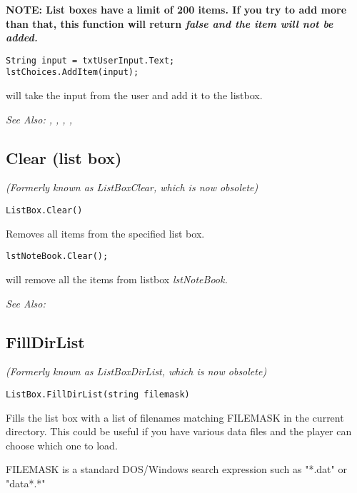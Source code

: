 \bf{NOTE:} List boxes have a limit of 200 items. If you try to add more than that,
this function will return \it{false} and the item will not be added.

\begin{verbatim}
String input = txtUserInput.Text;
lstChoices.AddItem(input);
\end{verbatim}
will take the input from the user and add it to the listbox.

\it{See Also:} ,
,
,
,


\subsection{Clear (list box)}\label{ListBox.Clear}%

\it{(Formerly known as ListBoxClear, which is now obsolete)}

\begin{verbatim}
ListBox.Clear()
\end{verbatim}
Removes all items from the specified list box.

\begin{verbatim}
lstNoteBook.Clear();
\end{verbatim}
will remove all the items from listbox \it{lstNoteBook}.

\it{See Also:} 


\subsection{FillDirList}\label{ListBox.FillDirList}%

\it{(Formerly known as ListBoxDirList, which is now obsolete)}

\begin{verbatim}
ListBox.FillDirList(string filemask)
\end{verbatim}
Fills the list box with a list of filenames matching FILEMASK in
the current directory. This could be useful if you have various
data files and the player can choose which one to load.

FILEMASK is a standard DOS/Windows search expression such as "*.dat"
or "data*.*"

